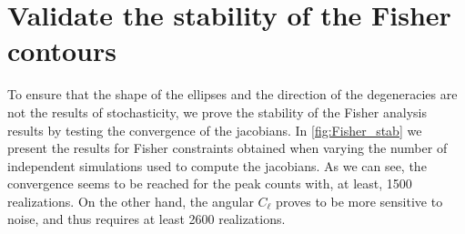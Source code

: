 \documentclass[twocolumn,twocolappendix]{aastex63}
\begin{document}
\section{Validate the stability of the Fisher contours}
To ensure that the shape of the ellipses and the direction of the degeneracies are not the results of stochasticity, we prove the stability of the Fisher analysis results by testing the convergence of the jacobians.
In \autoref{fig:Fisher_stab} we present the results for Fisher constraints obtained when varying the number of independent simulations used to compute the jacobians.  As we can see, the convergence seems to be reached for the peak counts with, at least, 1500 realizations. On the other hand, the angular $C_{\ell}$ proves to be more sensitive to noise, and thus requires at least 2600 realizations.
\end{document}
